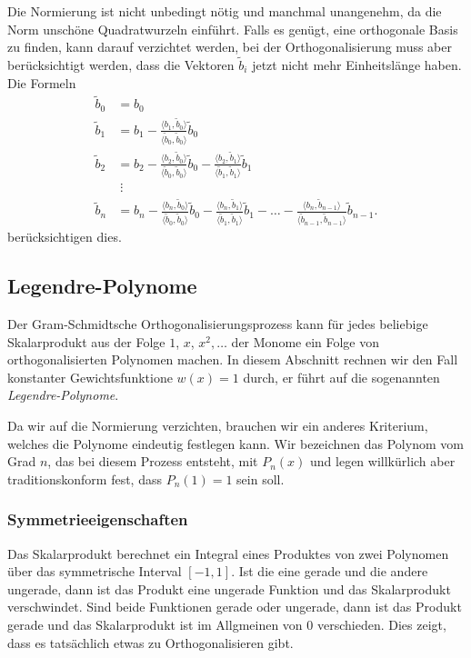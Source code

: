 Die Normierung ist nicht unbedingt nötig und manchmal unangenehm,
da die Norm unschöne Quadratwurzeln einführt.
Falls es genügt, eine orthogonale Basis zu finden, kann darauf
verzichtet werden, bei der Orthogonalisierung muss aber berücksichtigt
werden, dass die Vektoren $\tilde{b}_i$ jetzt nicht mehr Einheitslänge
haben.
Die Formeln
\begin{align*}
\tilde{b}_0
&=
b_0
\\
\tilde{b}_1
&=
b_1
-
\frac{\langle b_1,\tilde{b}_0\rangle}{\langle \tilde{b}_0,\tilde{b}_0\rangle}\tilde{b}_0
\\
\tilde{b}_2
&=
b_2
-
\frac{\langle b_2,\tilde{b}_0\rangle}{\langle \tilde{b}_0,\tilde{b}_0\rangle}\tilde{b}_0
-
\frac{\langle b_2,\tilde{b}_1\rangle}{\langle \tilde{b}_1,\tilde{b}_1\rangle}\tilde{b}_1
\\
&\;\vdots
\\
\tilde{b}_n
&=
b_n
-
\frac{\langle b_n,\tilde{b}_0\rangle}{\langle \tilde{b}_0,\tilde{b}_0\rangle}\tilde{b}_0
-
\frac{\langle b_n,\tilde{b}_1\rangle}{\langle \tilde{b}_1,\tilde{b}_1\rangle}\tilde{b}_1
-
\dots
-
\frac{\langle b_n,\tilde{b}_{n-1}\rangle}{\langle \tilde{b}_{n-1},\tilde{b}_{n-1}\rangle}\tilde{b}_{n-1}.
\end{align*}
berücksichtigen dies.

%
%
\subsection{Legendre-Polynome
\label{buch:orthogonal:subsection:legendre-polynome}}
Der Gram-Schmidtsche Orthogonalisierungsprozess kann für jedes beliebige
Skalarprodukt aus der Folge $1$, $x$, $x^2,\dots$ der Monome ein
Folge von orthogonalisierten Polynomen machen.
In diesem Abschnitt rechnen wir den Fall konstanter Gewichtsfunktione
$w(x)=1$ durch, er führt auf die sogenannten {\em Legendre-Polynome}.

Da wir auf die Normierung verzichten, brauchen wir ein anderes
Kriterium, welches die Polynome eindeutig festlegen kann.
Wir bezeichnen das Polynom vom Grad $n$, das bei diesem Prozess
entsteht, mit $P_n(x)$ und legen willkürlich aber traditionskonform
fest, dass $P_n(1)=1$ sein soll.

%
%
\subsubsection{Symmetrieeigenschaften}
Das Skalarprodukt berechnet ein Integral eines Produktes von zwei
Polynomen über das symmetrische Interval $[-1,1]$.
Ist die eine gerade und die andere ungerade, dann ist das
Produkt eine ungerade Funktion und das Skalarprodukt verschwindet.
Sind beide Funktionen gerade oder ungerade, dann ist das Produkt
gerade und das Skalarprodukt ist im Allgmeinen von $0$ verschieden.
Dies zeigt, dass es tatsächlich etwas zu Orthogonalisieren gibt.

